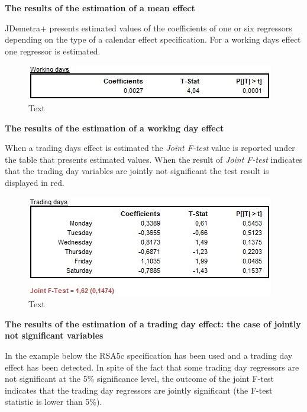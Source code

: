 \documentclass[
  letterpaper,
  DIV=11,
  numbers=noendperiod]{scrreprt}
\begin{document}
\textbf{The results of the estimation of a mean effect}

JDemetra+ presents estimated values of the coefficients of one or six
regressors depending on the type of a calendar effect specification. For
a working days effect one regressor is estimated.

\begin{figure}

{\centering \includegraphics{./All_images/image28_RMSB.jpg}

}

\caption{Text}

\end{figure}

\textbf{The results of the estimation of a working day effect}

When a trading days effect is estimated the \emph{Joint F-test} value is
reported under the table that presents estimated values. When the result
of \emph{Joint F-test} indicates that the trading day variables are
jointly not significant the test result is displayed in red.

\begin{figure}

{\centering \includegraphics{./All_images/image29_RMSB.jpg}

}

\caption{Text}

\end{figure}

\textbf{The results of the estimation of a trading day effect: the case
of jointly not significant variables}

In the example below the RSA5c specification has been used and a trading
day effect has been detected. In spite of the fact that some trading day
regressors are not significant at the 5\% significance level, the
outcome of the joint F-test indicates that the trading day regressors
are jointly significant (the F-test statistic is lower than 5\%).
\end{document}
